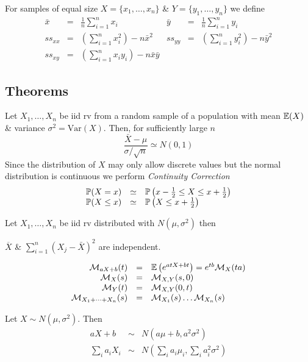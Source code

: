 \documentclass[11pt,a4paper]{article}
\begin{document}
For samples of equal size $X=\{x_1,\dots,x_n\}$ \& $Y=\{y_1,\dots,y_n\}$ we define
\[\begin{array}{rcl|rcl}
\bar{x}&=&\frac{1}{n}\sum_{i=1}^nx_i&\bar{y}&=&\frac{1}{n}\sum_{i=1}^ny_i\\
ss_{xx}&=&\left(\sum_{i=1}^nx_i^2\right)-n\bar{x}^2&ss_{yy}&=&\left(\sum_{i=1}^ny_i^2\right)-n\bar{y}^2\\
ss_{xy}&=&\left(\sum_{i=1}^nx_iy_i\right)-n\bar{x}\bar{y}
\end{array}\]

\subsection{Theorems}

Let $X_1,\dots,X_n$ be iid rv from a random sample of a population with mean $\mathbb{E}(X)$ \& variance $\sigma^2=\mathrm{Var}(X)$. Then, for sufficiently large $n$
$$\dfrac{\bar{X}-\mu}{\sigma/\sqrt{n}}\simeq N(0,1)$$
Since the distribution of $X$ may only allow discrete values but the normal distribution is continuous we perform \textit{Continuity Correction}
\[\begin{array}{rcl}
\mathbb{P}(X=x)&\simeq&\mathbb{P}\left(x-\frac{1}{2}\leq X\leq x+\frac{1}{2}\right)\\
\mathbb{P}(X\leq x)&\simeq&\mathbb{P}\left(X\leq x+\frac{1}{2}\right)
\end{array}
\]

Let $X_1,\dots,X_n$ be iid rv distributed with $N(\mu,\sigma^2)$ then
\begin{center}
$\overline{X}$ \& $\displaystyle{\sum_{i=1}^n\left(X_j-\bar{X}\right)^2}$ are independent.
\end{center}

\[\begin{array}{rcl}
\mathcal{M}_{aX+b}(t)&=&\mathbb{E}\left(e^{atX+bt}\right)=e^{tb}\mathcal{M}_X(ta)\\
\mathcal{M}_X(s)&=&\mathcal{M}_{X,Y}(s,0)\\
\mathcal{M}_Y(t)&=&\mathcal{M}_{X,Y}(0,t)\\
\mathcal{M}_{X_1+\dots+X_n}(s)&=&\mathcal{M}_{X_1}(s)\dots\mathcal{M}_{X_n}(s)
\end{array}\]

Let $X\sim N(\mu,\sigma^2)$. Then
\[\begin{array}{rcl}
aX+b&\sim&N(a\mu+b,a^2\sigma^2)\\
\sum_i a_iX_i&\sim&N\left(\sum_ia_i\mu_i,\sum_ia_i^2\sigma^2\right)
\end{array}\]
\end{document}
